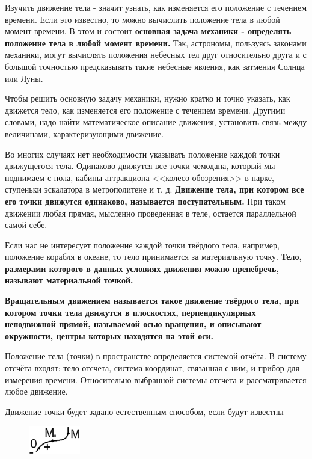 \documentclass[a5paper, 10pt]{diss_4}
\renewcommand{\'}{\,'}
\begin{document}
  Изучить движение тела - значит узнать, как изменяется его положение с
течением времени. Если это известно, то можно вычислить положение тела в любой
момент времени. В этом и состоит \textbf{основная задача механики - определять
положение тела в любой момент времени.} Так, астрономы, пользуясь законами
механики, могут вычислять положения небесных тел друг относительно друга и с
большой точностью предсказывать такие небесные явления, как затмения Солнца или
Луны.

  Чтобы решить основную задачу механики, нужно кратко и точно указать,
как движется тело, как изменяется его положение с течением времени. Другими
словами, надо найти математическое описание движения, установить связь между
величинами, характеризующими движение.

  Во многих случаях нет необходимости указывать положение каждой точки
движущегося тела. Одинаково движутся все точки чемодана, который мы поднимаем с
пола, кабины аттракциона <<колесо обозрения>> в парке, ступеньки эскалатора в
метрополитене и т. д. \textbf{Движение тела, при котором все его точки движутся
одинаково, называется поступательным.} При таком движении любая прямая, мысленно
проведенная в теле, остается параллельной самой себе.

  Если нас не интересует положение каждой точки твёрдого тела, например,
положение корабля в океане, то тело принимается за материальную точку.
\textbf{Тело, размерами которого в данных условиях движения можно пренебречь,
называют материальной точкой. }

\textbf{  Вращательным движением называется такое движение твёрдого тела, при
котором точки тела движутся в плоскостях, перпендикулярных неподвижной прямой,
называемой осью вращения, и описывают окружности, центры которых находятся на
этой оси. }


  Положение тела (точки) в пространстве определяется системой отчёта. В
систему отсчёта входят: тело отсчета, система координат, связанная с ним, и
прибор для измерения времени. Относительно выбранной системы отсчета и
рассматривается любое движение.

  Движение точки будет задано естественным способом, если будут известны

\begin{figure}[h]
\begin{center}
\includegraphics*[width=0.2\textwidth]{img/img04.eps}
\label{fig1}
\end{center}\end{figure}
\end{document}
